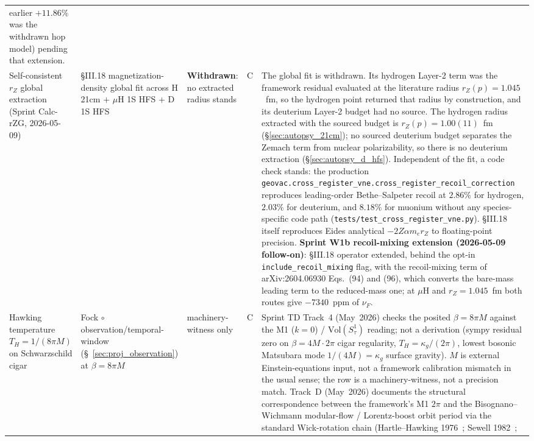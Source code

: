 \documentclass[11pt]{article}
\begin{document}
{\begin{longtable}{p{3.8cm} p{2.5cm} p{1.5cm} p{1.4cm} p{4.5cm}}
earlier $+11.86\%$ was the withdrawn hop model) pending that extension.
\\
Self-consistent $r_Z$ global extraction (Sprint Calc-rZG, 2026-05-09)
& §III.18 magnetization-density global fit across H 21cm $+$
$\mu$H 1S HFS $+$ D 1S HFS & \textbf{Withdrawn}: no extracted radius
stands & C & The global fit is withdrawn.  Its hydrogen Layer-2 term
was the framework residual evaluated at the literature radius
$r_Z(p) = 1.045$~fm, so the hydrogen point returned that radius by
construction, and its deuterium Layer-2 budget had no source.  The
hydrogen radius extracted with the sourced budget is
$r_Z(p) = 1.00(11)$~fm (\S\ref{sec:autopsy_21cm}); no sourced deuterium
budget separates the Zemach term from nuclear polarizability, so there
is no deuterium extraction (\S\ref{sec:autopsy_d_hfs}).  Independent of
the fit, a code check stands: the production
\texttt{geovac.cross\_register\_vne.cross\_register\_recoil\_correction}
reproduces leading-order Bethe--Salpeter recoil at $2.86\%$ for
hydrogen, $2.03\%$ for deuterium, and $8.18\%$ for muonium without
any species-specific code path (\texttt{tests/test\_cross\_register\_vne.py}).
\S III.18 itself reproduces Eides analytical
$-2 Z\alpha m_e r_Z$ to floating-point precision.
\textbf{Sprint W1b recoil-mixing extension
(2026-05-09 follow-on)}: \S III.18 operator extended, behind the opt-in
\texttt{include\_recoil\_mixing} flag, with the recoil-mixing term of
arXiv:2604.06930 Eqs.~(94) and (96), which converts the bare-mass
leading term to the reduced-mass one; at $\mu$H and $r_Z = 1.045$~fm
both routes give $-7340$~ppm of $\nu_F$. \\
Hawking temperature $T_H = 1/(8\pi M)$ on Schwarzschild cigar &
Fock $\circ$ observation/temporal-window
(\S~\ref{sec:proj_observation}) at $\beta = 8\pi M$ &
machinery-witness only & C &
Sprint TD Track~4 (May~2026) checks the posited $\beta = 8\pi M$ against the M1
($k = 0$) / $\mathrm{Vol}(S^1_\tau)$ reading; not a derivation (sympy
residual zero on $\beta = 4M\cdot 2\pi$ cigar regularity, $T_H =
\kappa_g/(2\pi)$, lowest bosonic Matsubara mode $1/(4M) = \kappa_g$
surface gravity).  $M$ is external Einstein-equations input, not a
framework calibration mismatch in the usual sense; the row is a
machinery-witness, not a precision match.  Track~D
(May~2026)
documents the structural correspondence between the framework's M1
$2\pi$ and the Bisognano--Wichmann modular-flow / Lorentz-boost
orbit period via the standard Wick-rotation chain (Hartle--Hawking
1976~\cite{hartle_hawking1976}; Sewell 1982~\cite{sewell1982};

\end{longtable}}
\end{document}
